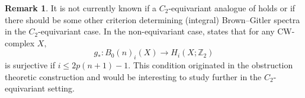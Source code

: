\documentclass[]{amsart}  %
\theoremstyle{definition}
\newtheorem{rmk}[equation]{Remark}
\numberwithin{equation}{section}
\numberwithin{figure}{section}
\newcommand{\mZ}{{\mathbb Z}}
\newcommand{\0}{\langle 0 \rangle}
\begin{document}
	
	\begin{rmk} \label{rmk:GeomCond}
		It is not currently known if a $C_2$-equivariant analogue of \cite[Theorem~1.5(iii)]{CDGM1988} holds or if there should be some other criterion determining (integral) Brown--Gitler spectra in the $C_2$-equivariant case. In the non-equivariant case, \cite[Theorem~1.5(iii)]{CDGM1988} states that for any CW-complex $X,$
		$$g_*: B_0(n)_i(X) \to H_i(X;\mZ_2)$$
		is surjective if $i \leq 2p(n + 1) - 1.$ This condition originated in the obstruction theoretic construction
  and would be interesting to study further in the $C_2$-equivariant setting. 
\end{rmk}



\end{document}
